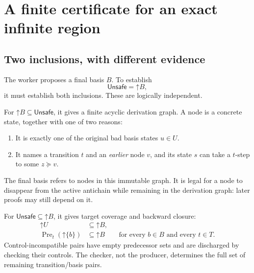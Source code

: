 \documentclass[11pt,a4paper]{article}
\theoremstyle{definition}
\newcommand{\Up}[1]{\mathord{\uparrow}#1}
\newcommand{\Pre}{\operatorname{Pre}}
\newcommand{\Unsafe}{\mathsf{Unsafe}}
\begin{document}
\section{A finite certificate for an exact infinite region}
\label{sec:certificate}

\subsection{Two inclusions, with different evidence}
The worker proposes a final basis $B$. To establish
\begin{equation}
 \Unsafe=\Up B,
 \label{eq:exact}
\end{equation}
it must establish both inclusions. These are logically independent.

For $\Up B\subseteq\Unsafe$, it gives a finite acyclic derivation graph.
A node is a concrete state, together with one of two reasons:
\begin{enumerate}[nosep,leftmargin=2em]
\item It is exactly one of the original bad basis states $u\in U$.
\item It names a transition $t$ and an \emph{earlier} node $v$, and its state
      $s$ can take a $t$-step to some $z\succeq v$.
\end{enumerate}
The final basis refers to nodes in this immutable graph. It is legal for a
node to disappear from the active antichain while remaining in the derivation
graph: later proofs may still depend on it.

For $\Unsafe\subseteq\Up B$, it gives target coverage and backward closure:
\begin{align}
 \Up U&\subseteq\Up B,\label{eq:targetcover}\\
 \Pre_t(\Up{\{b\}})&\subseteq\Up B
 &&\text{for every }b\in B\text{ and every }t\in T.
 \label{eq:closurecover}
\end{align}
Control-incompatible pairs have empty predecessor sets and are discharged by
checking their controls. The checker, not the producer, determines the full
set of remaining transition/basis pairs.
\end{document}
